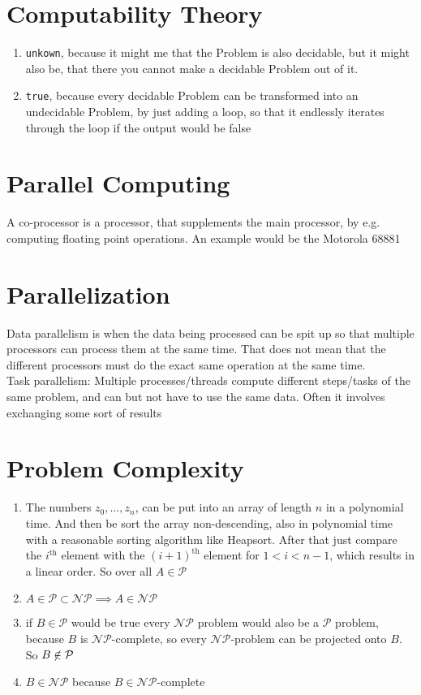 \documentclass[sectionformat = exercise]{gadsescript}
\begin{document}
\maketitle
\section{Computability Theory}
\begin{enumerate}[label=\roman*.]
	\item \texttt{unkown}, because it might me that the Problem is also decidable, but it might also be, that there you cannot make a decidable Problem out of it.
	\item \texttt{true}, because every decidable Problem can be transformed into an undecidable Problem, by just adding a loop, so that it endlessly iterates through the loop if the output would be false
\end{enumerate}

\section{Parallel Computing}
A co-processor is a processor, that supplements the main processor, by e.g. computing floating point operations. An example would be the Motorola 68881

\section{Parallelization}
Data parallelism is when the data being processed can be spit up so that multiple processors can process them at the same time. That does not mean that the different processors must do the exact same operation at the same time.\\
Task parallelism: Multiple processes/threads compute different steps/tasks of the same problem, and can but not have to use the same data. Often it involves exchanging some sort of results

\section{Problem Complexity}
\begin{enumerate}[label=\alph*)]
	\item The numbers $ z_0, \dotsc, z_n $, can be put into an array of length $ n $ in a polynomial time. And then be sort the array non-descending, also in polynomial time with a reasonable sorting algorithm like Heapsort. After that just compare the $ i^{\text{th} }  $ element with the $ (i + 1)^{\text{th} }  $ element for $ 1 < i < n - 1 $, which results in a linear order. So over all $ A \in \mathcal{P}  $
	\item $ A \in \mathcal{P} \subset \mathcal{NP} \implies A \in \mathcal{NP}  $
	\item if $ B \in \mathcal{P}  $ would be true every $ \mathcal{NP}  $ problem would also be a $ \mathcal{P}  $ problem, because $ B $ is $ \mathcal{NP}  $-complete, so every $ \mathcal{NP}  $-problem can be projected onto $ B $. So $ B \centernot \in \mathcal{P}  $
	\item $ B \in \mathcal{NP}  $ because $ B \in \mathcal{NP}  $-complete
\end{enumerate}
\end{document}
